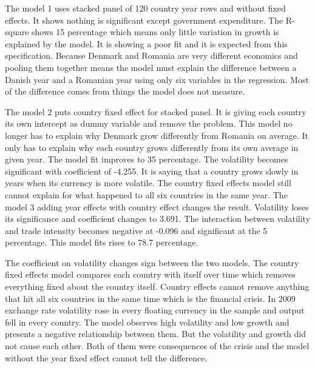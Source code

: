 The model 1 uses stacked panel of 120 country year rows and without fixed effects.
It shows nothing is significant except government expenditure.
The R-square shows 15 percentage which means only little variation in growth is explained by the model.
It is showing a poor fit and it is expected from this specification.
Because Denmark and Romania are very different economics and pooling them together means the model must explain the difference between a Danish year and a Romanian year using only six variables in the regression.
Most of the difference comes from things the model does not measure.

\vspace{\baselineskip}

The model 2 puts country fixed effect for stacked panel.
It is giving each country its own intercept as dummy variable and remove the problem.
This model no longer has to explain why Denmark grow differently from Romania on average.
It only has to explain why each country grows differently from its own average in given year.
The model fit improves to 35 percentage.
The volatility becomes significant with coefficient of -4.255.
It is saying that a country grows slowly in years when its currency is more volatile.
The country fixed effects model still cannot explain for what happened to all six countries in the same year.
The model 3 adding year effects with country effect changes the result.
Volatility loses its significance and coefficient changes to 3.691.
The interaction between volatility and trade intensity becomes negative at -0.096 and significant at the 5 percentage.
This model fits rises to 78.7 percentage.

\vspace{\baselineskip}

The coefficient on volatility changes sign between the two models.
The country fixed effects model compares each country with itself over time which removes everything fixed about the country itself.
Country effects cannot remove anything that hit all six countries in the same time which is the financial crisis.
In 2009 exchange rate volatility rose in every floating currency in the sample and output fell in every country.
The model observes high volatility and low growth and presents a negative relationship between them.
But the volatility and growth did not cause each other.
Both of them were consequences of the crisis and the model without the year fixed effect cannot tell the difference.

\vspace{\baselineskip}

